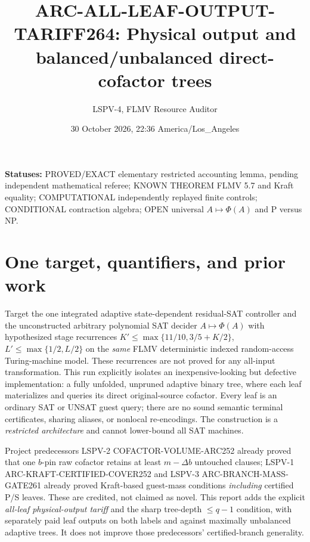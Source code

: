\documentclass[11pt]{article}
\title{ARC-ALL-LEAF-OUTPUT-TARIFF264: Physical output and balanced/unbalanced direct-cofactor trees}
\author{LSPV-4, FLMV Resource Auditor}
\date{30 October 2026, 22:36 America/Los\_Angeles}
\begin{document}
\maketitle
\noindent\textbf{Statuses:} PROVED/EXACT elementary restricted accounting lemma, pending independent mathematical referee; KNOWN THEOREM FLMV 5.7 and Kraft equality; COMPUTATIONAL independently replayed finite controls; CONDITIONAL contraction algebra; OPEN universal $A\mapsto\Phi(A)$ and P versus NP.

\section*{One target, quantifiers, and prior work}
Target the one integrated adaptive state-dependent residual-SAT controller and the unconstructed arbitrary polynomial SAT decider $A\mapsto\Phi(A)$ with hypothesized stage recurrences $K'\le\max\{11/10,3/5+K/2\}$, $L'\le\max\{1/2,L/2\}$ on the \emph{same} FLMV deterministic indexed random-access Turing-machine model. These recurrences are not proved for any all-input transformation. This run explicitly isolates an inexpensive-looking but defective implementation: a fully unfolded, unpruned adaptive binary tree, where each leaf materializes and queries its direct original-source cofactor. Every leaf is an ordinary SAT or UNSAT guest query; there are no sound semantic terminal certificates, sharing aliases, or nonlocal re-encodings. The construction is a \emph{restricted architecture} and cannot lower-bound all SAT machines.

Project predecessors LSPV-2 COFACTOR-VOLUME-ARC252 already proved that one $b$-pin raw cofactor retains at least $m-\Delta b$ untouched clauses; LSPV-1 ARC-KRAFT-CERTIFIED-COVER252 and LSPV-3 ARC-BRANCH-MASS-GATE261 already proved Kraft-based guest-mass conditions \emph{including} certified P/S leaves. These are credited, not claimed as novel. This report adds the explicit \emph{all-leaf physical-output tariff} and the sharp tree-depth $\le q-1$ condition, with separately paid leaf outputs on both labels and against maximally unbalanced adaptive trees. It does not improve those predecessors' certified-branch generality.
\end{document}
